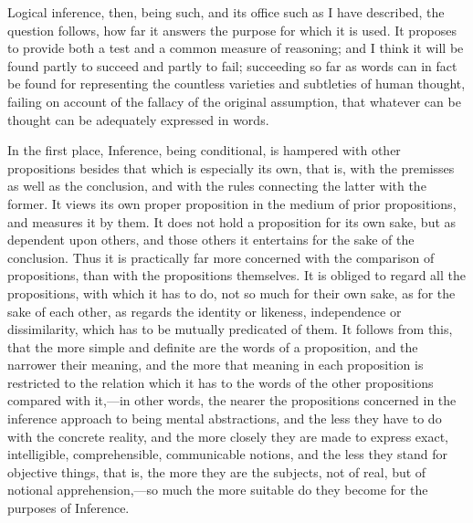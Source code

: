 Logical inference, then, being such, and its office such as I have
described, the question follows, how far it answers the purpose for
which it is used. It proposes to provide both a test and a common
measure of reasoning; and I think it will be found partly to succeed
and partly to fail; succeeding so far as words can in fact be found
for representing the countless varieties and subtleties of human
thought, failing on account of the fallacy of the original assumption,
that whatever can be thought can be adequately expressed in words.

In the first place, Inference, being conditional, is hampered with
other propositions besides that which is especially its own, that is,
with the premisses as well as the conclusion, and with the rules
connecting the latter with the former. It views its own proper
proposition in the medium of prior propositions, and measures it by
them. It does not hold a proposition for its own sake, but as
dependent upon others, and those others it entertains for the sake of
the conclusion. Thus it is practically far more concerned with the
comparison of propositions, than with the propositions themselves. It
is obliged to regard all the propositions, with which it has to do,
not so much for their own sake, as for the sake of each other, as
regards the identity or likeness, independence or dissimilarity, which
has to be mutually predicated of them. It follows from this, that the
more simple and definite are the words of a proposition, and the
narrower their meaning, and the more that meaning in each proposition
is restricted to the relation which it has to the words of the other
propositions compared with it,—in other words, the nearer the
propositions concerned in the inference approach to being mental
abstractions, and the less they have to do with the concrete reality,
and the more closely they are made to express exact, intelligible,
comprehensible, communicable notions, and the less they stand for
objective things, that is, the more they are the subjects, not of
real, but of notional apprehension,—so much the more suitable do
they become for the purposes of Inference.

